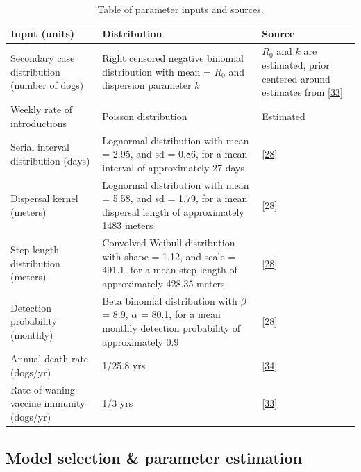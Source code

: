 \documentclass[
  oneside]{book}
\begin{document}
\begin{table}

\caption{\label{tab:tbinputs}Table of parameter inputs and sources.}
\centering
\begin{tabu} to 
\toprule
Input (units) & Distribution & Source\\
\midrule
Secondary case distribution (number of dogs) & Right censored negative binomial distribution with mean = $R_{0}$ and dispersion parameter $k$ & $R_{0}$ and $k$ are estimated, prior centered around estimates from \protect\hyperlink{ref-Hampson2009}{{[}33{]}}\\
Weekly rate of introductions & Poisson distribution & Estimated\\
Serial interval distribution (days) & Lognormal distribution with mean = 2.95, and sd = 0.86, for a mean interval of approximately 27 days & \protect\hyperlink{ref-Mancyinprep}{{[}28{]}}\\
Dispersal kernel (meters) & Lognormal distribution with mean = 5.58, and sd = 1.79, for a mean dispersal length of approximately 1483 meters & \protect\hyperlink{ref-Mancyinprep}{{[}28{]}}\\
Step length distribution (meters) & Convolved Weibull distribution with shape = 1.12, and scale = 491.1, for a mean step length of approximately 428.35 meters & \protect\hyperlink{ref-Mancyinprep}{{[}28{]}}\\
\addlinespace
Detection probability (monthly) & Beta binomial distribution with $\beta$ = 8.9, $\alpha$ = 80.1, for a mean monthly detection probability of approximately 0.9 & \protect\hyperlink{ref-Mancyinprep}{{[}28{]}}\\
Annual death rate (dogs/yr) & 1/25.8 yrs & \protect\hyperlink{ref-czupryna2016}{{[}34{]}}\\
Rate of waning vaccine immunity (dogs/yr) & 1/3 yrs & \protect\hyperlink{ref-Hampson2009}{{[}33{]}}\\
\bottomrule
\end{tabu}
\end{table}







\hypertarget{model-selection-parameter-estimation}{%
\subsection{Model selection \& parameter estimation}\label{model-selection-parameter-estimation}}
\end{document}
